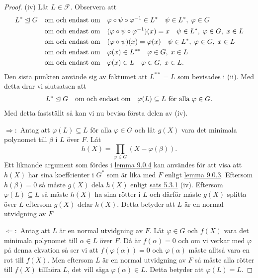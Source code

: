 \documentclass{article}
\theoremstyle{definition}
\begin{document}
\begin{proof}
  (iv) Låt $L \in \mathcal{F}$. Observera att 
  \begin{align*}
    L^* \trianglelefteq G \quad &\textnormal{om och endast om} \quad \varphi \circ \psi \circ \varphi^{-1} \in L^* 
    \quad  \psi \in L^*, \; \varphi \in G \\
    &\textnormal{om och endast om} \quad (\varphi \circ \psi \circ \varphi^{-1})(x) = x 
    \quad  \psi \in L^*, \; \varphi \in G, \; x \in L \\
    &\textnormal{om och endast om} \quad (\varphi \circ \psi) (x) = \varphi(x) 
    \quad  \psi \in L^*, \; \varphi \in G, \; x \in L \\
    &\textnormal{om och endast om} \quad \varphi(x) \in L^{**}
    \quad  \varphi \in G, \; x \in L \\
    &\textnormal{om och endast om} \quad \varphi(x) \in L
    \quad  \varphi \in G, \; x \in L.
  \end{align*}
  Den sista punkten använde sig av faktumet att $L^{**} = L$ som bevisades i (ii). Med detta drar vi slutsatsen att 
  \begin{align*}
    L^* \trianglelefteq G \quad \textnormal{om och endast om} \quad \varphi(L) \subseteq L \textnormal{ för alla } \varphi \in G.
  \end{align*}
  Med detta fastställt så kan vi nu bevisa första delen av (iv). 

  $\Rightarrow:$ Antag att $\varphi(L) \subseteq L$ för alla $\varphi \in G$ och låt $g(X)$ vara det minimala polynomet till $\beta$ i $L$ över $F$. Låt 
  \[h(X) = \prod_{\varphi \in G} (X - \varphi(\beta)).\]
  Ett liknande argument som fördes i \hyperlink{lemma9.0.4}{lemma 9.0.4} kan användes för att visa att $h(X)$ har sina koeffcienter i $G^*$
  som är lika med $F$ enligt \hyperlink{lemma9.0.3}{lemma 9.0.3}. Eftersom $h(\beta) = 0$ så måste $g(X)$ dela $h(X)$ enligt \hyperlink{minpol}{sats 5.3.1} (iv).
  Eftersom $\varphi(L) \subseteq L$ så måste $h(X)$ ha sina rötter i $L$ och därför måste $g(X)$ splitta över $L$ eftersom $g(X)$ delar $h(X)$. 
  Detta betyder att $L$ är en normal utvidgning av $F$

  $\Leftarrow:$ Antag att $L$ är en normal utvidgning av $F$. Låt $\varphi \in G$ och $f(X)$ vara det minimala polynomet till $\alpha \in L$ över $F$. Då är 
  $f(\alpha) = 0$ och om vi verkar med $\varphi$ på denna ekvation så ser vi att $f(\varphi(\alpha)) = 0$ och $\varphi(\alpha)$ måste alltså vara 
  en rot till $f(X)$. Men eftersom $L$ är en normal utvidgning av $F$ så måste alla rötter till $f(X)$ tillhöra $L$, det vill säga $\varphi(\alpha) \in L$. 
  Detta betyder att $\varphi(L) = L$.


\end{proof}
\end{document}
